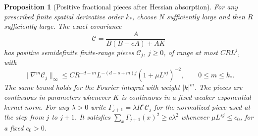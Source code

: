 \documentclass[11pt]{article}
\newtheorem{proposition}{Proposition}[section]
\begin{document}
\begin{proposition}[Positive fractional pieces after Hessian absorption]
\label{complete:covariance-prop}
For any prescribed finite spatial derivative order \(k_*\), choose
\(N\) sufficiently large and then \(R\) sufficiently large. The exact
covariance
\begin{equation}\label{complete:target-cov}
 \mathscr C=\frac{A}{B(B-cA)+AK}
\end{equation}
has positive semidefinite finite-range pieces \(\mathscr C_j\),
\(j\ge0\), of range at most \(CRL^j\), with
\begin{equation}\label{complete:cov-bounds}
 \|\nabla^m\mathscr C_j\|_\infty
 \le C R^{-d-m}L^{-(d-s+m)j}
              (1+\mu L^{sj})^{-2},\qquad 0\le m\le k_*.
\end{equation}
The same bound holds for the Fourier integral with weight \(|k|^m\).
The pieces are continuous in parameters whenever \(K\) is continuous
in a fixed weaker exponential kernel norm. For any \(\lambda>0\)
write \(\Gamma_{j+1}=\lambda R^s\mathscr C_j\) for the normalized
piece used at the step from \(j\) to \(j+1\). It satisfies
\(\sum_x\Gamma_{j+1}(x)^2\ge c\lambda^2\) whenever
\(\mu L^{sj}\le c_0\), for a fixed \(c_0>0\).
\end{proposition}
\end{document}
